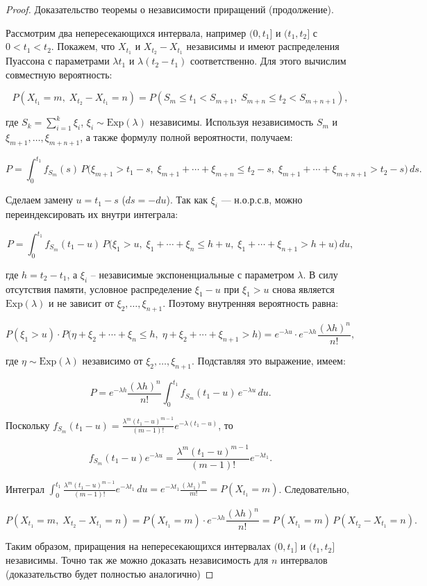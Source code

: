 \begin{proof}
    Доказательство теоремы о независимости приращений (продолжение).

Рассмотрим два непересекающихся интервала, например \((0, t_1]\) и \((t_1, t_2]\) с \(0<t_1<t_2\). Покажем, что \(X_{t_1}\) и \(X_{t_2}-X_{t_1}\) независимы и имеют распределения Пуассона с параметрами \(\lambda t_1\) и \(\lambda(t_2-t_1)\) соответственно. Для этого вычислим совместную вероятность:

\[
P(X_{t_1}=m,\; X_{t_2}-X_{t_1}=n)=P(S_m\le t_1<S_{m+1},\; S_{m+n}\le t_2<S_{m+n+1}),
\]

где \(S_k=\sum_{i=1}^k\xi_i\), \(\xi_i\sim\text{Exp}(\lambda)\) независимы. Используя независимость \(S_m\) и \(\xi_{m+1},\dots,\xi_{m+n+1}\), а также формулу полной вероятности, получаем:

\[
P=\int_0^{t_1} f_{S_m}(s)\,P\bigl(\xi_{m+1}>t_1-s,\; \xi_{m+1}+\cdots+\xi_{m+n}\le t_2-s,\; \xi_{m+1}+\cdots+\xi_{m+n+1}>t_2-s\bigr)\,ds.
\]

Сделаем замену \(u=t_1-s\) (\(ds=-du\)). Так как \(\xi_i\) --- н.о.р.с.в, можно переиндексировать их внутри интеграла:

\[
P=\int_0^{t_1} f_{S_m}(t_1-u)\,P\bigl(\xi_{1}>u,\; \xi_{1}+\cdots+\xi_{n}\le h+u,\; \xi_{1}+\cdots+\xi_{n+1}>h+u\bigr)\,du,
\]

где \(h=t_2-t_1\), а \(\xi_i\) – независимые экспоненциальные с параметром \(\lambda\). В силу отсутствия памяти, условное распределение \(\xi_1-u\) при \(\xi_1>u\) снова является \(\text{Exp}(\lambda)\) и не зависит от \(\xi_2,\dots,\xi_{n+1}\). Поэтому внутренняя вероятность равна:

\[
P(\xi_1>u)\cdot P\bigl(\eta+\xi_2+\cdots+\xi_n\le h,\; \eta+\xi_2+\cdots+\xi_{n+1}>h\bigr)=e^{-\lambda u}\cdot e^{-\lambda h}\frac{(\lambda h)^n}{n!},
\]

где \(\eta\sim\text{Exp}(\lambda)\) независимо от \(\xi_2,\dots,\xi_{n+1}\). Подставляя это выражение, имеем:

\[
P=e^{-\lambda h}\frac{(\lambda h)^n}{n!}\int_0^{t_1} f_{S_m}(t_1-u)\,e^{-\lambda u}\,du.
\]

Поскольку \(f_{S_m}(t_1-u)=\frac{\lambda^m (t_1-u)^{m-1}}{(m-1)!}e^{-\lambda(t_1-u)}\), то

\[
f_{S_m}(t_1-u)e^{-\lambda u}= \frac{\lambda^m (t_1-u)^{m-1}}{(m-1)!}e^{-\lambda t_1}.
\]

Интеграл \(\int_0^{t_1} \frac{\lambda^m (t_1-u)^{m-1}}{(m-1)!}e^{-\lambda t_1}\,du = e^{-\lambda t_1}\frac{(\lambda t_1)^m}{m!}=P(X_{t_1}=m)\). Следовательно,

\[
P(X_{t_1}=m,\; X_{t_2}-X_{t_1}=n)=P(X_{t_1}=m)\cdot e^{-\lambda h}\frac{(\lambda h)^n}{n!}=P(X_{t_1}=m)\,P(X_{t_2}-X_{t_1}=n).
\]

Таким образом, приращения на непересекающихся интервалах \((0,t_1]\) и \((t_1,t_2]\) независимы. Точно так же можно доказать независимость для \(n\) интервалов (доказательство будет полностью аналогично)
\end{proof}

